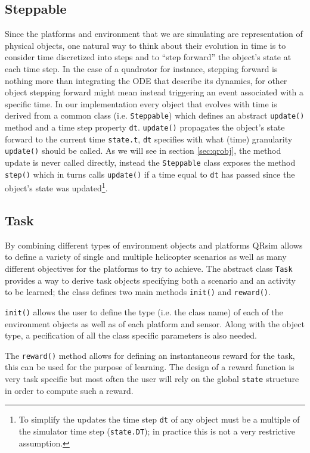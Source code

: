 \documentclass[a4paper,11pt]{report}
\newcommand{\sname}{QRsim\xspace}
\begin{document}
\subsection{Steppable}

Since the platforms and environment that we are simulating are representation of physical objects, one natural way to think about their evolution in time is to consider time discretized into steps and to ``step forward'' the object's state at each time step. In the case of a quadrotor for instance, stepping forward is nothing more than integrating the ODE that describe its dynamics, for other object stepping forward might mean instead triggering an event associated with a specific time.
In our implementation every object that evolves with time is derived from a common class (i.e. \texttt{Steppable}) which defines an abstract \texttt{update()} method and a time step property \texttt{dt}. \texttt{update()} propagates the object's state forward to the current time \texttt{state.t}, \texttt{dt} specifies with what (time) granularity \texttt{update()} should be called. As we will see in section \ref{sec:qrobj}, the method update is never called directly, instead the  \texttt{Steppable} class exposes the method \texttt{step()} which in turns calls \texttt{update()} if a time equal to \texttt{dt} has passed since the object's state was updated\footnote{To simplify the updates the time step \texttt{dt} of any object must be a multiple of the simulator time step (\texttt{state.DT}); in practice this is not a very restrictive assumption.}.

\subsection{Task}

By combining different types of environment objects and platforms \sname allows to define a variety of single and multiple helicopter scenarios as well as many different objectives for the platforms to try to achieve. 
The abstract class \texttt{Task} provides a way to derive task objects specifying both a scenario and an activity to be learned; the class defines two main methods \texttt{init()} and \texttt{reward()}.

\texttt{init()} allows the user to define the type (i.e. the class name) of each of the environment objects as well as of each platform and sensor. 
Along with the object type, a pecification of all the class specific parameters is also needed.

The \texttt{reward()} method allows for defining an instantaneous reward for the task, this can be used for the purpose of learning. The design of a reward function is very task specific but most often the user will rely on the global \texttt{state} structure in order to compute such a reward.
\end{document}
